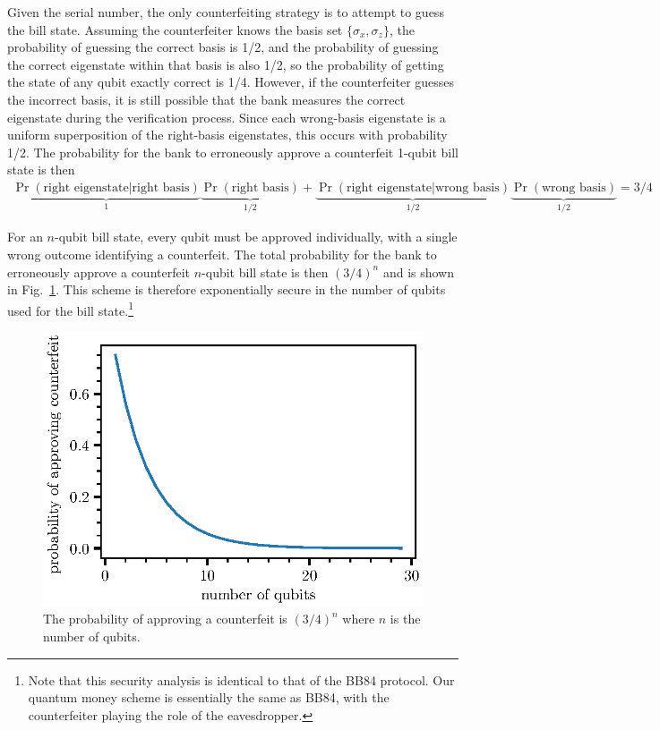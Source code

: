 \documentclass[12pt]{article}
\begin{document}
\begin{appendices}
\begin{enumerate}[label=\alph*)]
    Given the serial number, the only counterfeiting strategy is to attempt to guess the bill state. Assuming the counterfeiter knows the basis set $\{\sigma_x, \sigma_z\}$, the probability of guessing the correct basis is 1/2, and the probability of guessing the correct eigenstate within that basis is also 1/2, so the probability of getting the state of any qubit exactly correct is 1/4. However, if the counterfeiter guesses the incorrect basis, it is still possible that the bank measures the correct eigenstate during the verification process. Since each wrong-basis eigenstate is a uniform superposition of the right-basis eigenstates, this occurs with probability 1/2. The probability for the bank to erroneously approve a counterfeit 1-qubit bill state is then
    \begin{align}
        \underbrace{\Pr(\text{right eigenstate}|\text{right basis})}_{1}
        \underbrace{\Pr(\text{right basis})}_{1/2} +
        \underbrace{\Pr(\text{right eigenstate}|\text{wrong basis})}_{1/2}
        \underbrace{\Pr(\text{wrong basis})}_{1/2}
        = 3/4
    \end{align}
    
    For an $n$-qubit bill state, every qubit must be approved individually, with a single wrong outcome identifying a counterfeit. The total probability for the bank to erroneously approve a counterfeit $n$-qubit bill state is then $(3/4)^n$ and is shown in Fig.~\ref{fig:quantum-money}. This scheme is therefore exponentially secure in the number of qubits used for the bill state.\footnote{Note that this security analysis is identical to that of the BB84 protocol. Our quantum money scheme is essentially the same as BB84, with the counterfeiter playing the role of the eavesdropper.}
    \begin{figure}[htpb]
        \centering
        \includegraphics[width=0.6\linewidth]{quantum-money.eps}
        \caption{The probability of approving a counterfeit is $(3/4)^n$ where $n$ is the number of qubits.}
        \label{fig:quantum-money}
    \end{figure}
\end{enumerate}



\end{appendices}
\end{document}
